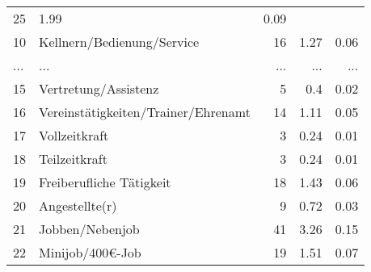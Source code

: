 \begin{longtable}{lXrrr}
          \num{25} &
          \num[round-mode=places,round-precision=2]{1.99} &
          \num[round-mode=places,round-precision=2]{0.09} \\
        10 & \multicolumn{1}{X}{Kellnern/Bedienung/Service} & %
          \num{16} &
          \num[round-mode=places,round-precision=2]{1.27} &
          \num[round-mode=places,round-precision=2]{0.06} \\
       ... & ... & ... & ... & ... \\
        15 & \multicolumn{1}{X}{Vertretung/Assistenz} & %
          \num{5} &
          \num[round-mode=places,round-precision=2]{0.4} &
          \num[round-mode=places,round-precision=2]{0.02} \\

        16 & \multicolumn{1}{X}{Vereinstätigkeiten/Trainer/Ehrenamt} & %
          \num{14} &
          \num[round-mode=places,round-precision=2]{1.11} &
          \num[round-mode=places,round-precision=2]{0.05} \\

        17 & \multicolumn{1}{X}{Vollzeitkraft} & %
          \num{3} &
          \num[round-mode=places,round-precision=2]{0.24} &
          \num[round-mode=places,round-precision=2]{0.01} \\

        18 & \multicolumn{1}{X}{Teilzeitkraft} & %
          \num{3} &
          \num[round-mode=places,round-precision=2]{0.24} &
          \num[round-mode=places,round-precision=2]{0.01} \\

        19 & \multicolumn{1}{X}{Freiberufliche Tätigkeit} & %
          \num{18} &
          \num[round-mode=places,round-precision=2]{1.43} &
          \num[round-mode=places,round-precision=2]{0.06} \\

        20 & \multicolumn{1}{X}{Angestellte(r)} & %
          \num{9} &
          \num[round-mode=places,round-precision=2]{0.72} &
          \num[round-mode=places,round-precision=2]{0.03} \\

        21 & \multicolumn{1}{X}{Jobben/Nebenjob} & %
          \num{41} &
          \num[round-mode=places,round-precision=2]{3.26} &
          \num[round-mode=places,round-precision=2]{0.15} \\

        22 & \multicolumn{1}{X}{Minijob/400€-Job} & %
          \num{19} &
          \num[round-mode=places,round-precision=2]{1.51} &
          \num[round-mode=places,round-precision=2]{0.07} \\


\end{longtable}
